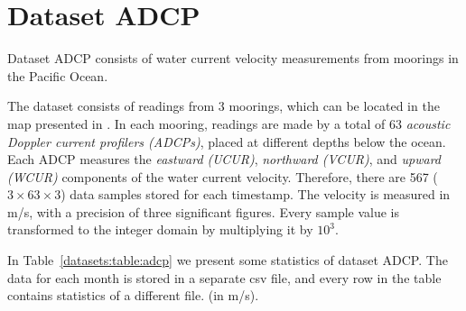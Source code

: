
\vspace{-10pt}
\section{Dataset ADCP}
\label{datasets:adcp}


Dataset ADCP \cite{dataset:sst1} consists of water current velocity measurements from moorings in the Pacific Ocean. \TAODef


The dataset consists of readings from 3 moorings, which can be located in the map presented in \cite{dataset:sst1}. In each mooring, readings are made by a total of 63 \textit{acoustic Doppler current profilers (ADCPs)}, placed at different depths below the ocean. Each ADCP measures the \textit{eastward (UCUR)}, \textit{northward (VCUR)}, and \textit{upward (WCUR)} components of the water current velocity. Therefore, there are 567 ($3\times63\times3$) data samples stored for each timestamp. The velocity is measured in m/s, with a precision of three significant figures. Every sample value is transformed to the integer domain by multiplying it by $10^3$.


In Table~\ref{datasets:table:adcp} we present some statistics of dataset ADCP. The data for each month is stored in a separate csv file, and every row in the table contains statistics of a different file. \commonTable (in m/s).




